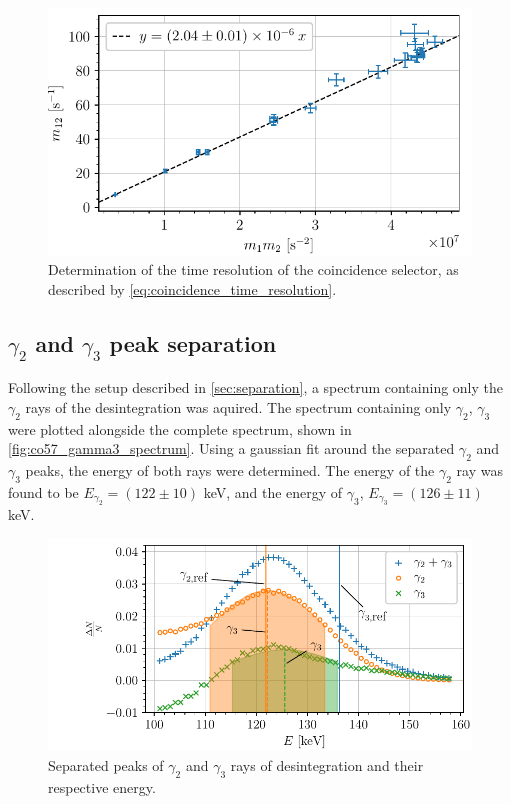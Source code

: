 \begin{figure}[htbp]
    \centering
    \includegraphics[scale=1]{figures/twotheta_cs137.pdf}
    \caption{Determination of the time resolution of the coincidence
    selector, as described by \autoref{eq:coincidence_time_resolution}.}
    \label{fig:twotheta_cs137}
\end{figure}


\subsection{$\gamma_2$ and $\gamma_3$ peak separation}

Following the setup described in \autoref{sec:separation}, a spectrum containing only the \(\gamma_2\) rays of the \cobalt desintegration was aquired. The spectrum containing only \(\gamma_2\), \(\gamma_3\) were plotted alongside the complete spectrum, shown in \autoref{fig:co57_gamma3_spectrum}. Using a gaussian fit around the separated \(\gamma_2\) and \(\gamma_3\) peaks, the energy of both rays were determined. The energy of the \(\gamma_2\) ray was found to be \(E_{\gamma_2} = (122 \pm 10)\) keV, and the energy of \(\gamma_3\), \(E_{\gamma_3} = (126 \pm 11)\) keV.

\begin{figure}[htbp]
    \centering
    \includegraphics[scale=1]{figures/co57_gamma2_gamma3.pdf}
    \caption{Separated peaks of $\gamma_2$ and $\gamma_3$ rays of \cobalt desintegration and their respective energy.}
    \label{fig:co57_gamma3_spectrum}
\end{figure}

